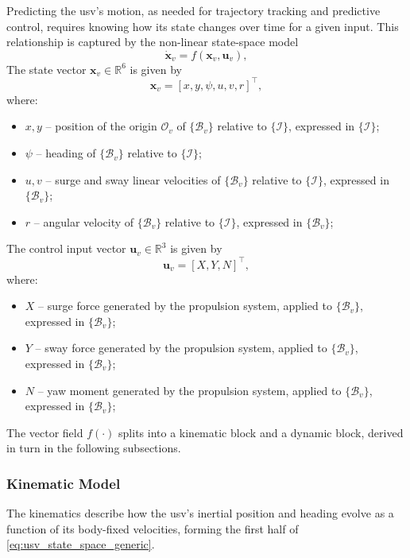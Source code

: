 Predicting the \gls{usv}'s motion, as needed for trajectory tracking and predictive control, requires knowing how its state changes over time for a given input. This relationship is captured by the non-linear state-space model
\begin{equation}
    \label{eq:usv_state_space_generic}
    \dot{\mathbf{x}}_v = f(\mathbf{x}_v, \mathbf{u}_v),
\end{equation}
The state vector $\mathbf{x}_v \in \mathbb{R}^6$ is given by
\begin{equation}
    \label{eq:usv_state_vector}
    \mathbf{x}_v = [x, y, \psi, u, v, r]^\top,
\end{equation}
where:
\begin{itemize}
    \item $x, y$ -- position of the origin $\mathcal{O}_v$ of $\{\mathcal{B}_v\}$ relative to $\{\mathcal{I}\}$, expressed in $\{\mathcal{I}\}$;
    \item $\psi$ -- heading of $\{\mathcal{B}_v\}$ relative to $\{\mathcal{I}\}$;
    \item $u, v$ -- surge and sway linear velocities of $\{\mathcal{B}_v\}$ relative to $\{\mathcal{I}\}$, expressed in $\{\mathcal{B}_v\}$;
    \item $r$ -- angular velocity of $\{\mathcal{B}_v\}$ relative to $\{\mathcal{I}\}$, expressed in $\{\mathcal{B}_v\}$;
\end{itemize}
The control input vector $\mathbf{u}_v \in \mathbb{R}^3$ is given by
\begin{equation}
    \label{eq:usv_input_vector}
    \mathbf{u}_v = [X, Y, N]^\top,
\end{equation}
where:
\begin{itemize}
    \item $X$ -- surge force generated by the propulsion system, applied to $\{\mathcal{B}_v\}$, expressed in $\{\mathcal{B}_v\}$;
    \item $Y$ -- sway force generated by the propulsion system, applied to $\{\mathcal{B}_v\}$, expressed in $\{\mathcal{B}_v\}$;
    \item $N$ -- yaw moment generated by the propulsion system, applied to $\{\mathcal{B}_v\}$, expressed in $\{\mathcal{B}_v\}$;
\end{itemize}
The vector field $f(\cdot)$ splits into a kinematic block and a dynamic block, derived in turn in the following subsections.

\subsubsection{Kinematic Model}
\label{subsec:mod_usv_kinematics}
The kinematics describe how the \gls{usv}'s inertial position and heading evolve as a function of its body-fixed velocities, forming the first half of \eqref{eq:usv_state_space_generic}.

